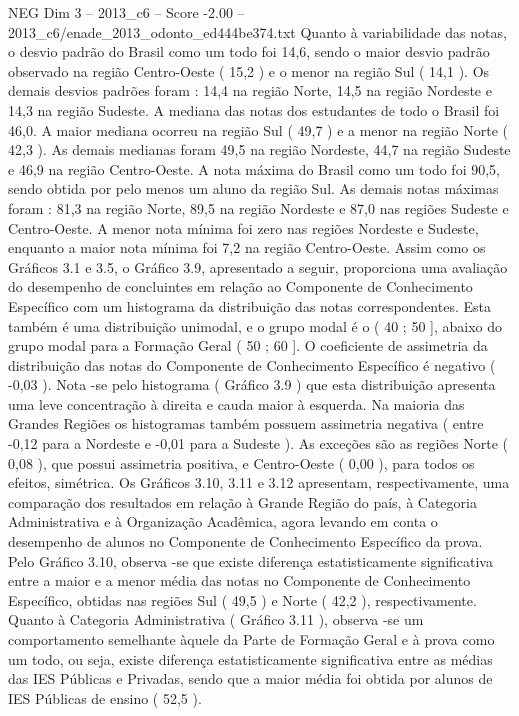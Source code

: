 \begin{textsample}{NEG Dim 3 – 2013\_c6 – Score -2.00 – 2013\_c6/enade\_2013\_odonto\_ed444be374.txt}
Quanto à variabilidade das notas, o desvio padrão do Brasil como um todo foi 14,6, sendo o maior desvio padrão observado na região Centro-Oeste ( 15,2 ) e o menor na região Sul ( 14,1 ).
Os demais desvios padrões foram : 14,4 na região Norte, 14,5 na região Nordeste e 14,3 na região Sudeste.
A mediana das notas dos estudantes de todo o Brasil foi 46,0.
A maior mediana ocorreu na região Sul ( 49,7 ) e a menor na região Norte ( 42,3 ).
As demais medianas foram 49,5 na região Nordeste, 44,7 na região Sudeste e 46,9 na região Centro-Oeste.
A nota máxima do Brasil como um todo foi 90,5, sendo obtida por pelo menos um aluno da região Sul.
As demais notas máximas foram : 81,3 na região Norte, 89,5 na região Nordeste e 87,0 nas regiões Sudeste e Centro-Oeste.
A menor nota mínima foi zero nas regiões Nordeste e Sudeste, enquanto a maior nota mínima foi 7,2 na região Centro-Oeste.
Assim como os Gráficos 3.1 e 3.5, o Gráfico 3.9, apresentado a seguir, proporciona uma avaliação do desempenho de concluintes em relação ao Componente de Conhecimento Específico com um histograma da distribuição das notas correspondentes.
Esta também é uma distribuição unimodal, e o grupo modal é o ( 40 ; 50 ], abaixo do grupo modal para a Formação Geral ( 50 ; 60 ].
O coeficiente de assimetria da distribuição das notas do Componente de Conhecimento Específico é negativo ( -0,03 ).
Nota -se pelo histograma ( Gráfico 3.9 ) que esta distribuição apresenta uma leve concentração à direita e cauda maior à esquerda.
Na maioria das Grandes Regiões os histogramas também possuem assimetria negativa ( entre -0,12 para a Nordeste e -0,01 para a Sudeste ).
As exceções são as regiões Norte ( 0,08 ), que possui assimetria positiva, e Centro-Oeste ( 0,00 ), para todos os efeitos, simétrica.
Os Gráficos 3.10, 3.11 e 3.12 apresentam, respectivamente, uma comparação dos resultados em relação à Grande Região do país, à Categoria Administrativa e à Organização Acadêmica, agora levando em conta o desempenho de alunos no Componente de Conhecimento Específico da prova.
Pelo Gráfico 3.10, observa -se que existe diferença estatisticamente significativa entre a maior e a menor média das notas no Componente de Conhecimento Específico, obtidas nas regiões Sul ( 49,5 ) e Norte ( 42,2 ), respectivamente.
Quanto à Categoria Administrativa ( Gráfico 3.11 ), observa -se um comportamento semelhante àquele da Parte de Formação Geral e à prova como um todo, ou seja, existe diferença estatisticamente significativa entre as médias das IES Públicas e Privadas, sendo que a maior média foi obtida por alunos de IES Públicas de ensino ( 52,5 ).

\end{textsample}
